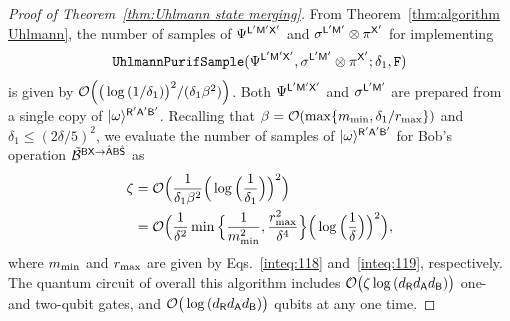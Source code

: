 \begin{proof}[Proof of Theorem~\ref{thm:Uhlmann state merging}]
From Theorem~\ref{thm:algorithm Uhlmann}, the number of samples of $\Psi^{{\mathsf{L}}'{\mathsf{M}}'{\mathsf{X}}'}$ and $\sigma^{{\mathsf{L}}'{\mathsf{M}}'}\otimes\pi^{{\mathsf{X}}'}$ for implementing 
\begin{align}
    \mathtt{UhlmannPurifSample}(\Psi^{{\mathsf{L}}'{\mathsf{M}}'{\mathsf{X}}'}, \sigma^{{\mathsf{L}}'{\mathsf{M}}'}\otimes\pi^{{\mathsf{X}}'}; \delta_1, \mathtt{F}) 
\end{align}
is given by ${\mathcal{O}}\Big(\big(\log{(1/\delta_1)}\big)^2/(\delta_1\beta^2)\Big)$. 
Both $\Psi^{{\mathsf{L}}'{\mathsf{M}}'{\mathsf{X}}'}$ and $\sigma^{{\mathsf{L}}'{\mathsf{M}}'}$ are prepared from a single copy of $|\omega\rangle^{{\mathsf{R}}'{\mathsf{A}}'{\mathsf{B}}'}$. 
Recalling that $\beta = {\mathcal{O}}(\max\{m_{\rm min}, \delta_1/r_{\rm max}\})$ and $\delta_1 \leq (2\delta/5)^2$, we evaluate the number of samples of $|\omega\rangle^{{\mathsf{R}}'{\mathsf{A}}'{\mathsf{B}}'}$ for Bob's operation $\tilde{{\mathcal{B}}}^{{\mathsf{B}}{\mathsf{X}} \rightarrow\hat{{\mathsf{A}}}{\mathsf{B}}\hat{{\mathsf{S}}}}$ as
\begin{align}
    \zeta 
    &= {\mathcal{O}}\Big(\frac{1}{\delta_1\beta^2}\Big(\log{\Big(\frac{1}{\delta_1}\Big)}\Big)^2\Big) \notag\\
    &= {\mathcal{O}}\Big(\frac{1}{\delta^2}\min\Big\{\frac{1}{m_{\rm min}^2}, \frac{r_{\rm max}^2}{\delta^4}\Big\}\Big(\log{\Big(\frac{1}{\delta}\Big)}\Big)^2\Big),
\end{align}
where $m_{\rm min}$ and $r_{\rm max}$ are given by Eqs.~\eqref{inteq:118} and~\eqref{inteq:119}, respectively.
The quantum circuit of overall this algorithm includes ${\mathcal{O}}\big(\zeta\log{(d_{\mathsf{R}}d_{\mathsf{A}}d_{\mathsf{B}})}\big)$ one- and two-qubit gates, and ${\mathcal{O}}\big(\log{(d_{\mathsf{R}}d_{\mathsf{A}}d_{\mathsf{B}})}\big)$ qubits at any one time.




\end{proof}

























